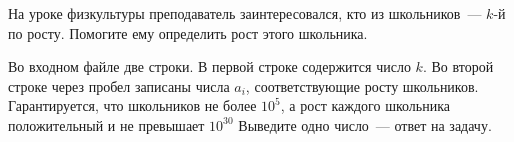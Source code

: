 На уроке физкультуры преподаватель заинтересовался, кто из школьников~--- $k$-й по росту.
Помогите ему определить рост этого школьника.

\InputFile
Во входном файле две строки. В первой строке содержится число $k$. Во второй строке через пробел записаны числа $a_i$, соответствующие росту школьников.
Гарантируется, что школьников не более $10^5$, а рост каждого школьника положительный и не превышает $10^{30}$ 
\OutputFile
Выведите одно число~--- ответ на задачу.
